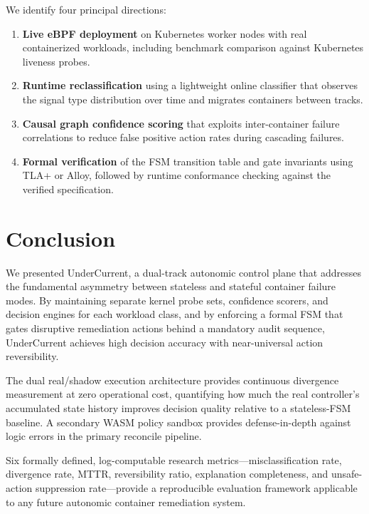 \documentclass[runningheads]{llncs}
\begin{document}
We identify four principal directions:

\begin{enumerate}
  \item \textbf{Live eBPF deployment} on Kubernetes worker nodes with
    real containerized workloads, including benchmark comparison against
    Kubernetes liveness probes.
  \item \textbf{Runtime reclassification} using a lightweight online
    classifier that observes the signal type distribution over time
    and migrates containers between tracks.
  \item \textbf{Causal graph confidence scoring} that exploits
    inter-container failure correlations to reduce false positive
    action rates during cascading failures.
  \item \textbf{Formal verification} of the FSM transition table and
    gate invariants using TLA+ or Alloy, followed by runtime
    conformance checking against the verified specification.
\end{enumerate}

\section{Conclusion}
\label{sec:conclusion}

We presented UnderCurrent, a dual-track autonomic control plane that
addresses the fundamental asymmetry between stateless and stateful
container failure modes.  By maintaining separate kernel probe sets,
confidence scorers, and decision engines for each workload class, and
by enforcing a formal FSM that gates disruptive remediation actions
behind a mandatory audit sequence, UnderCurrent achieves high decision
accuracy with near-universal action reversibility.

The dual real/shadow execution architecture provides continuous
divergence measurement at zero operational cost, quantifying how much
the real controller's accumulated state history improves decision quality
relative to a stateless-FSM baseline.  A secondary WASM policy sandbox
provides defense-in-depth against logic errors in the primary reconcile
pipeline.

Six formally defined, log-computable research metrics---misclassification
rate, divergence rate, MTTR, reversibility ratio, explanation completeness,
and unsafe-action suppression rate---provide a reproducible evaluation
framework applicable to any future autonomic container remediation system.
\end{document}
